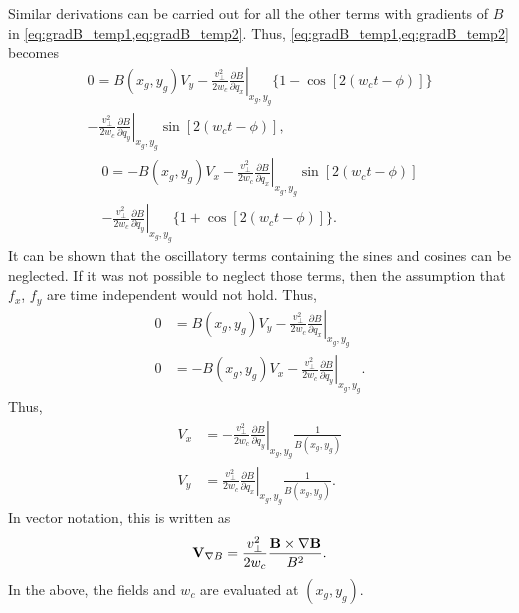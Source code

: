 \documentclass[oneside,a4paper,11pt]{report}
\begin{document}
Similar derivations can be carried out for all the other terms with gradients of $B$ in \cref{eq:gradB_temp1,eq:gradB_temp2}. Thus, \cref{eq:gradB_temp1,eq:gradB_temp2} becomes 
\begin{multline}
    0 = B(x_g,y_g) V_y -\frac{ v^2_\perp}{2 w_c} \left . \frac{\partial B}{\partial q_x} \right |_{x_g,y_g} \{1 - \cos [ 2 (w_c t - \phi)] \} \\
    - \frac{ v^2_\perp}{2 w_c} \left .\frac{\partial B}{\partial q_y} \right |_{x_g,y_g} \sin [ 2(w_ct - \phi)],
\end{multline}
\begin{multline}
    0 = -B(x_g,y_g) V_x -\frac{ v^2_\perp}{2 w_c} \left . \frac{\partial B}{\partial q_x} \right |_{x_g,y_g} \sin [ 2 (w_c t - \phi)] \\
    - \frac{ v^2_\perp}{2 w_c} \left .\frac{\partial B}{\partial q_y} \right |_{x_g,y_g} \{ 1 + \cos [ 2(w_ct - \phi)] \}.
\end{multline}
It can be shown that the oscillatory terms containing the sines and cosines can be neglected. If it was not possible to neglect those terms, then the assumption that $f_x$, $f_y$ are time independent would not hold. Thus,
\begin{subequations}
\begin{alignat}{2}
    0 &= B(x_g,y_g) V_y - \frac{ v^2_\perp}{2 w_c} \left . \frac{\partial B}{\partial q_x} \right |_{x_g,y_g} \nonumber \\
    0 &= -B(x_g,y_g) V_x -\frac{ v^2_\perp}{2 w_c} \left . \frac{\partial B}{\partial q_y} \right |_{x_g,y_g} . 
\end{alignat}
\end{subequations}
Thus,
\begin{align}
    V_x &= -\frac{v^2_\perp}{2 w_c} \left . \frac{\partial B}{\partial q_y} \right |_{x_g,y_g} \frac{1}{B(x_g,y_g)} \nonumber \\
    V_y &= \frac{v^2_\perp}{2 w_c} \left . \frac{\partial B}{\partial q_x} \right |_{x_g,y_g} \frac{1}{B(x_g,y_g)} . 
\end{align}
In vector notation, this is written as
\begin{equation}
    \mathbf{V}_{\nabla B} = \frac{v^2_\perp}{2 w_c} \frac{ \mathbf{B} \times \nabla \mathbf{B} }{B^2}.
\end{equation}
In the above, the fields and $w_c$ are evaluated at $(x_g,y_g)$.

\end{document}
